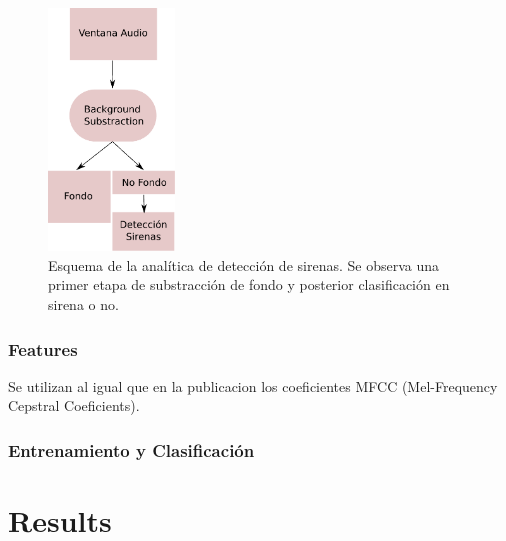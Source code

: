 \documentclass{article}
\begin{document}
\begin{figure}[h]
\begin{center}
\includegraphics[width=0.3\textwidth]{deteccion_sirenas} 
\caption{Esquema de la analítica de detección de sirenas. Se observa una primer etapa de substracción de fondo y posterior clasificación en sirena o no.}
\label{fig:deteccion_sirenas}
\end{center}
\end{figure}

\subsubsection{Features}
Se utilizan al igual que en la publicacion \cite{Salamon:UrbanSound:ACMMM:14} los coeficientes MFCC (Mel-Frequency Cepstral Coeficients). 
\subsubsection{Entrenamiento y Clasificación}



\section{Results}

\end{document}
